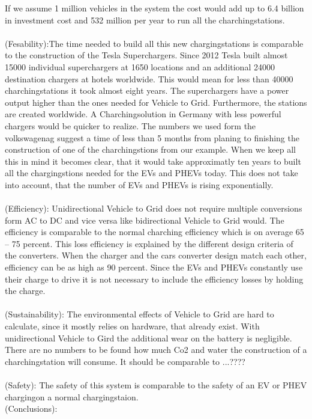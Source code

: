 \documentclass[12pt,a4paper]{article}
\begin{document}
\begin{parcolumns}[colwidths={1=2.5 cm, 2=10 cm, 3=2.5cm}]{3}
{%
If we assume 1 million vehicles in the system the cost would add up to 6.4 billion in investment cost and 532 million per year to run all the charchingstations.
\\ \\
\noindent
(Fesability):The time needed to build all this new chargingstations is comparable to the construction of the Tesla Superchargers. Since 2012 Tesla built almost 15000 individual superchargers at 1650 locations and an additional 24000 destination chargers at hotels worldwide. This would mean for less than 40000 charchingstations it took almost eight years.
The superchargers have a power output higher than the ones needed for Vehicle to Grid. Furthermore, the stations are created worldwide. A Charchingsolution in Germany with less powerful chargers would be quicker to realize. The numbers we used form the volkswagenag suggest a time of less than 5 months from planing to finishing the construction of one of the charchingstions from our example. When we keep all this in mind it becomes clear, that it would take approximatly ten years to built all the chargingstions needed for the EVs and PHEVs today. This does not take into account, that the number of EVs and PHEVs is rising exponentially.
\\ \\
\noindent
(Efficiency): Unidirectional Vehicle to Grid does not require multiple conversions form AC to DC and vice versa like bidirectional Vehicle to Grid would. The efficiency is comparable to the normal charching efficiency which is on average 65 – 75 percent. This loss efficiency is explained by the different design criteria of the converters. When the charger and the cars converter design match each other, efficiency can be as high as 90 percent. Since the EVs and PHEVs constantly use their charge to drive it is not necessary to include the efficiency losses by holding the charge.%
\\ \\
\noindent
(Sustainability): The environmental effects of Vehicle to Grid are hard to calculate, since it mostly relies on hardware, that already exist. With unidirectional Vehicle to Gird the additional wear on the battery is negligible. There are no numbers to be found how much Co2 and water the construction of a charchingstation will consume. It should be comparable to ...????
\\ \\
\noindent
(Safety): The safety of this system is comparable to the safety of an EV or PHEV chargingon a normal chargingstaion.
\\
\noindent
(Conclusions):
}


\end{parcolumns}
\end{document}
